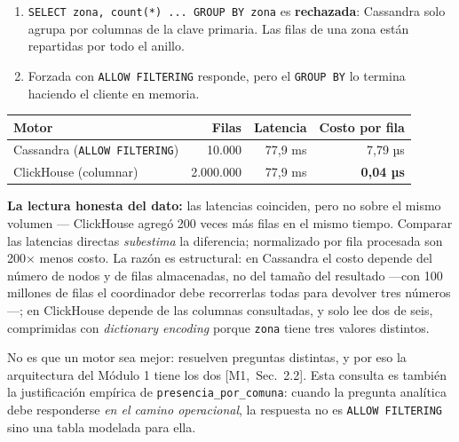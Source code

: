 \documentclass[11pt,a4paper]{article}
\newcommand{\mI}[1]{\textcolor{acento}{\small[M1,~Sec.~#1]}}
\begin{document}
\begin{enumerate}[leftmargin=*,itemsep=1pt]
\item \texttt{SELECT zona, count(*) ... GROUP BY zona} es \textbf{rechazada}:
Cassandra solo agrupa por columnas de la clave primaria. Las filas de una zona
están repartidas por todo el anillo.
\item Forzada con \texttt{ALLOW FILTERING} responde, pero el \texttt{GROUP BY} lo
termina haciendo el cliente en memoria.
\end{enumerate}

\begin{center}\small
\begin{tabular}{@{}lrrr@{}}
\toprule
\textbf{Motor} & \textbf{Filas} & \textbf{Latencia} & \textbf{Costo por fila} \\
\midrule
Cassandra (\texttt{ALLOW FILTERING}) & 10.000 & 77,9 ms & 7,79 µs \\
ClickHouse (columnar) & 2.000.000 & 77,9 ms & \textbf{0,04 µs} \\
\bottomrule
\end{tabular}
\end{center}

\noindent\textbf{La lectura honesta del dato:} las latencias coinciden, pero no
sobre el mismo volumen — ClickHouse agregó 200 veces más filas en el mismo tiempo.
Comparar las latencias directas \emph{subestima} la diferencia; normalizado por
fila procesada son 200$\times$ menos costo. La razón es estructural: en Cassandra
el costo depende del número de nodos y de filas almacenadas, no del tamaño del
resultado —con 100 millones de filas el coordinador debe recorrerlas todas para
devolver tres números—; en ClickHouse depende de las columnas consultadas, y solo
lee dos de seis, comprimidas con \emph{dictionary encoding} porque \texttt{zona}
tiene tres valores distintos.

No es que un motor sea mejor: resuelven preguntas distintas, y por eso la
arquitectura del Módulo 1 tiene los dos \mI{2.2}. Esta consulta es también la
justificación empírica de \texttt{presencia\_por\_comuna}: cuando la pregunta
analítica debe responderse \emph{en el camino operacional}, la respuesta no es
\texttt{ALLOW FILTERING} sino una tabla modelada para ella.

\end{document}
